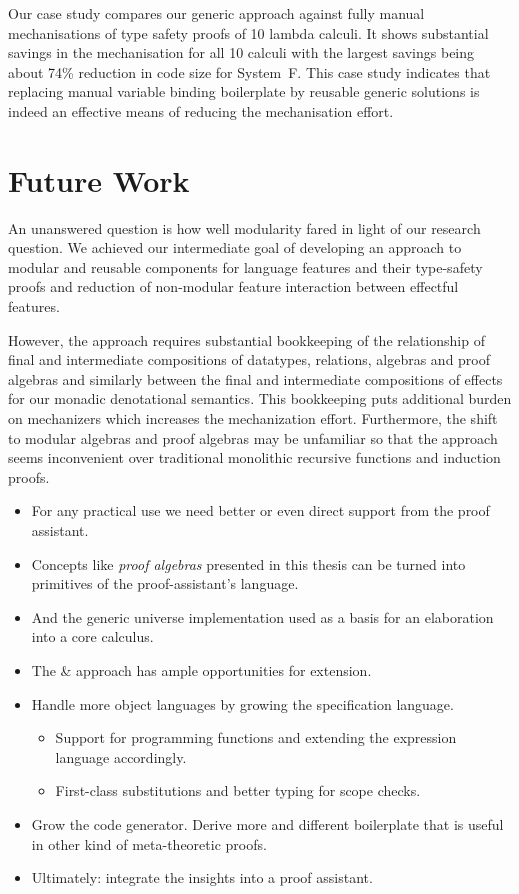 Our case study compares our generic approach against fully manual mechanisations
of type safety proofs of 10 lambda calculi. It shows substantial savings in the
mechanisation for all 10 calculi with the largest savings being about 74\%
reduction in code size for System~F. This case study indicates that replacing
manual variable binding boilerplate by reusable generic solutions is indeed an
effective means of reducing the mechanisation effort.


\section{Future Work}

An unanswered question is how well modularity fared in light of our research
question. We achieved our intermediate goal of developing an approach to modular
and reusable components for language features and their type-safety proofs and
reduction of non-modular feature interaction between effectful features.

However, the approach requires substantial bookkeeping of the relationship of
final and intermediate compositions of datatypes, relations, algebras and proof
algebras and similarly between the final and intermediate compositions of
effects for our monadic denotational semantics. This bookkeeping puts additional
burden on mechanizers which increases the mechanization effort. Furthermore, the
shift to modular algebras and proof algebras may be unfamiliar so that the
approach seems inconvenient over traditional monolithic recursive functions and
induction proofs.




\begin{itemize}
\item For any practical use we need better or even direct support from the
  proof assistant.
\item Concepts like \emph{proof algebras} presented in this thesis can
  be turned into primitives of the proof-assistant's language.
\item And the generic universe implementation used as a basis for an
  elaboration into a core calculus.
\end{itemize}

\begin{itemize}
\item The \Needle \& \Knot approach has ample opportunities for extension.
\item Handle more object languages by growing the specification language.
  \begin{itemize}
  \item Support for programming functions and extending the expression language
    accordingly.
  \item First-class substitutions and better typing for scope checks.
  \end{itemize}
\item Grow the code generator. Derive more and different boilerplate that is
  useful in other kind of meta-theoretic proofs.
\item Ultimately: integrate the insights into a proof assistant.
\end{itemize}
